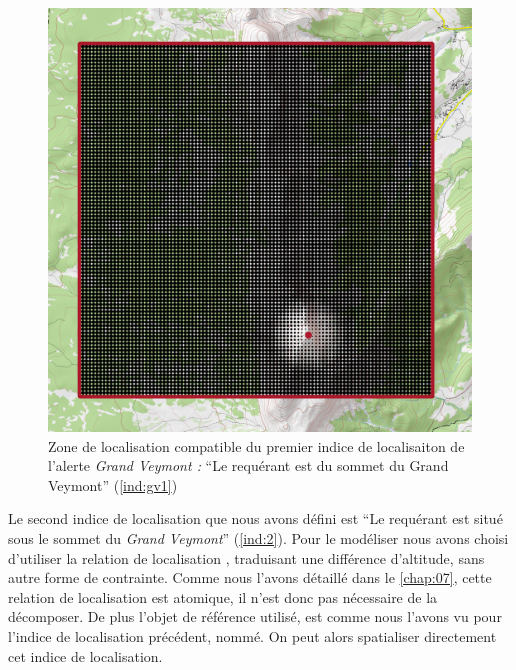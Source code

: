 \begin{figure}
  \centering \includegraphics{./figures/PasSommet_GrandVeymont.png}
  \caption{Zone de localisation compatible du premier indice de
    localisaiton de l'alerte \emph{Grand Veymont :} \enquote{Le
      requérant est \protect{}
      du sommet du Grand Veymont} (\ref{ind:gv1})}
  \label{fig:ZLC_GrandVeymont_1}
\end{figure}

Le second indice de localisation que nous avons défini est \enquote{Le
  requérant est situé sous le sommet du \emph{Grand Veymont}}
(\ref{ind:2}). Pour le modéliser nous avons choisi d'utiliser la
relation de localisation , traduisant une
différence d'altitude, sans autre forme de contrainte. Comme nous
l'avons détaillé dans le \autoref{chap:07}, cette relation de
localisation est atomique, il n'est donc pas nécessaire de la
décomposer. De plus l'objet de référence utilisé, est comme nous
l'avons vu pour l'indice de localisation précédent, nommé. On peut
alors spatialiser directement cet indice de localisation.

